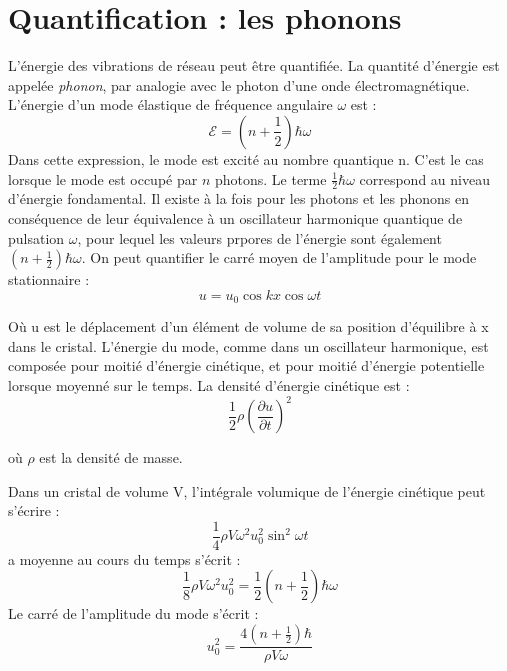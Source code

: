 \chapter{Quantification : les phonons}

L'énergie des vibrations de réseau peut être quantifiée. La quantité d'énergie
est appelée \emph{phonon}, par analogie avec le photon d'une onde
électromagnétique. L'énergie d'un mode élastique de fréquence angulaire $\omega$
est :
\begin{equation}
\mathcal{E} = \left( n + \frac{1}{2} \right) \hbar \omega
\end{equation}
Dans cette expression, le mode est excité au nombre quantique n. C'est le cas
lorsque le mode est occupé par $n$ photons. Le terme $\frac{1}{2}\hbar\omega$
correspond au niveau d'énergie fondamental. Il existe à la fois pour les photons
et les phonons en conséquence de leur équivalence à un oscillateur harmonique quantique de pulsation $\omega$, pour lequel les valeurs prpores de
l'énergie sont également $(n+\frac{1}{2})\hbar\omega$. On peut quantifier le
carré moyen de l'amplitude pour le mode stationnaire :
\begin{equation}
u = u_0 \cos kx \cos \omega t
\end{equation}

Où u est le déplacement d'un élément de volume de sa position d'équilibre à x
dans le cristal. L'énergie du mode, comme dans un oscillateur harmonique, est
composée pour moitié d'énergie cinétique, et pour moitié d'énergie potentielle
lorsque moyenné sur le temps. La densité d'énergie cinétique est :
\begin{equation}
\frac{1}{2}\rho \left( \frac{\partial u}{\partial t} \right)^2
\end{equation}

où $\rho$ est la densité de masse.

Dans un cristal de volume V, l'intégrale volumique de l'énergie cinétique
peut s'écrire :
\begin{equation}
\frac{1}{4}\rho V \omega^2 u_0^2 \sin^2 \omega t
\end{equation}
a moyenne au cours du temps s'écrit : 
\begin{equation}
    \frac{1}{8} \rho V \omega^2 u_0^2 = \frac{1}{2} \left( n+\frac{1}{2} \right) \hbar \omega
\end{equation}
Le carré de l'amplitude du mode s'écrit :
\begin{equation}
u_0^2 = \frac{4\left( n+\frac{1}{2} \right) \hbar}{\rho V \omega}
\end{equation}

